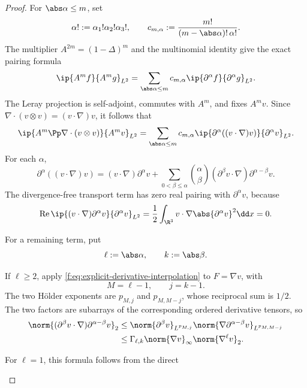 \begin{proof}
For \(\abs\alpha\le m\), set
\[
 \alpha!:=\alpha_1!\alpha_2!\alpha_3!,
 \qquad
 c_{m,\alpha}:=\frac{m!}{(m-\abs\alpha)!\,\alpha!}.
\]
The multiplier \(A^{2m}=(1-\Delta)^m\) and the multinomial identity give the
exact pairing formula
\begin{equation}
 \ip{A^mf}{A^mg}_{L^2}
 =\sum_{\abs\alpha\le m}c_{m,\alpha}
   \ip{\partial^\alpha f}{\partial^\alpha g}_{L^2}.
 \label{f:eq:integer-Am-pairing}
\end{equation}
The Leray projection is self-adjoint, commutes with \(A^m\), and fixes
\(A^mv\).  Since
\(\nabla\cdot(v\otimes v)=(v\cdot\nabla)v\), it follows that
\begin{equation}
 \ip{A^m\Pp\nabla\cdot(v\otimes v)}{A^mv}_{L^2}
 =\sum_{\abs\alpha\le m}c_{m,\alpha}
   \ip{\partial^\alpha((v\cdot\nabla)v)}
      {\partial^\alpha v}_{L^2}.
 \label{f:eq:integer-projected-pairing}
\end{equation}
For each \(\alpha\),
\[
 \partial^\alpha((v\cdot\nabla)v)
 =(v\cdot\nabla)\partial^\alpha v
 +\sum_{0<\beta\le\alpha}\binom\alpha\beta
 (\partial^\beta v\cdot\nabla)
 \partial^{\alpha-\beta}v.
\]
The divergence-free transport term has zero real pairing with
\(\partial^\alpha v\), because
\[
 \operatorname{Re}\ip{(v\cdot\nabla)\partial^\alpha v}
 {\partial^\alpha v}_{L^2}
 =\frac12\int_{\R^3}v\cdot\nabla
   \abs{\partial^\alpha v}^2\dd x=0.
\]
\begin{samepage}
For a remaining term, put
\[
 \ell:=\abs\alpha,
 \qquad k:=\abs\beta.
\]
\par
\end{samepage}
\begin{samepage}
If \(\ell\ge2\), apply
\eqref{f:eq:explicit-derivative-interpolation} to \(F=\nabla v\), with
\[
 M=\ell-1,
 \qquad j=k-1.
\]
The two H\"older exponents are \(p_{M,j}\) and \(p_{M,M-j}\), whose
reciprocal sum is \(1/2\).  The two factors are subarrays of the corresponding
ordered derivative tensors, so
\begin{align}
 \norm{(\partial^\beta v\cdot\nabla)
          \partial^{\alpha-\beta}v}_2
 &\le
 \norm{\partial^\beta v}_{L^{p_{M,j}}}
 \norm{\nabla\partial^{\alpha-\beta}v}_{L^{p_{M,M-j}}}\notag\\
 &\le\Gamma_{\ell,k}\norm{\nabla v}_\infty
       \norm{\nabla^\ell v}_2.
 \label{f:eq:explicit-commutator-product}
\end{align}
\par
\end{samepage}
\begin{samepage}
For \(\ell=1\), this formula follows from the direct

\end{samepage}
\end{proof}
